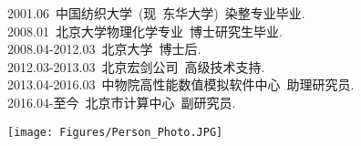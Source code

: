\newpage	        %
\thispagestyle{fancy}   %
\vskip 40pt
\begin{minipage}[b]{0.69\textwidth}
{\hspace*{120pt} }
\vskip 25pt
\hspace*{-10pt} {\fontsize{15.0pt}{10.0pt}\selectfont{姜骏，北京市计算中心~~副研究员}}
\vskip 4pt
\hspace*{-10pt} 2001.06~中国纺织大学~(现~东华大学)~染整专业毕业.\\
\hspace*{-10pt} 2008.01~北京大学物理化学专业~博士研究生毕业.\\
\hspace*{-10pt} 2008.04-2012.03~北京大学~博士后.\\
\hspace*{-10pt} 2012.03-2013.03~北京宏剑公司~高级技术支持.\\
\hspace*{-10pt} 2013.04-2016.03~中物院高性能数值模拟软件中心~助理研究员.\\
\hspace*{-10pt} 2016.04-至今~北京市计算中心~副研究员.
\end{minipage}
\hskip 15pt
\begin{minipage}[b]{0.19\textwidth}
\vspace{17pt}
\texttt{[image: Figures/Person\_Photo.JPG]}
\end{minipage}
\vskip 30pt

